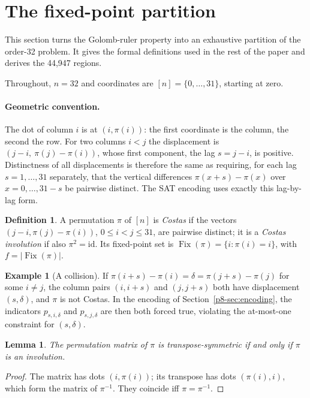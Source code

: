 \documentclass[11pt,a4paper,oneside]{report}
\newtheorem{lemma}[theorem]{Lemma}
\theoremstyle{definition}
\newtheorem{definition}[theorem]{Definition}
\newtheorem{example}[theorem]{Example}
\newcommand{\Fix}{\operatorname{Fix}}
\begin{document}
\section{The fixed-point partition}\label{p8-sec:framework}
This section turns the Golomb-ruler property into an exhaustive partition of the order-32 problem. It gives the formal definitions used in the rest of the paper and derives the 44{,}947 regions.


Throughout, $n=32$ and coordinates are $[n]=\{0,\dots,31\}$, starting at zero.

\paragraph{Geometric convention.} The dot of column $i$ is at $(i,\pi(i))$: the first
coordinate is the column, the second the row. For two columns $i<j$ the displacement is
$(j-i,\ \pi(j)-\pi(i))$, whose first component, the lag $s=j-i$, is positive.
Distinctness of all displacements is therefore the same as requiring, for each lag
$s=1,\dots,31$ separately, that the vertical differences $\pi(x+s)-\pi(x)$ over
$x=0,\dots,31-s$ be pairwise distinct. The SAT encoding uses exactly this lag-by-lag form.

\begin{definition}
A permutation $\pi$ of $[n]$ is \emph{Costas} if the vectors $(j-i,\pi(j)-\pi(i))$,
$0\le i<j\le 31$, are pairwise distinct; it is a \emph{Costas involution} if also
$\pi^2=\mathrm{id}$. Its fixed-point set is $\Fix(\pi)=\{i:\pi(i)=i\}$, with $f=|\Fix(\pi)|$.
\end{definition}

\begin{example}[A collision]
If $\pi(i+s)-\pi(i)=\delta=\pi(j+s)-\pi(j)$ for some $i\ne j$, the column pairs $(i,i+s)$
and $(j,j+s)$ both have displacement $(s,\delta)$, and $\pi$ is not Costas. In the encoding
of Section~\ref{p8-sec:encoding}, the indicators $p_{s,i,\delta}$ and $p_{s,j,\delta}$ are then
both forced true, violating the at-most-one constraint for $(s,\delta)$.
\end{example}

\begin{lemma}\label{p8-lem:sym}
The permutation matrix of $\pi$ is transpose-symmetric if and only if $\pi$ is an involution.
\end{lemma}
\begin{proof}
The matrix has dots $(i,\pi(i))$; its transpose has dots $(\pi(i),i)$, which form the matrix
of $\pi^{-1}$. They coincide iff $\pi=\pi^{-1}$.
\end{proof}
\end{document}
